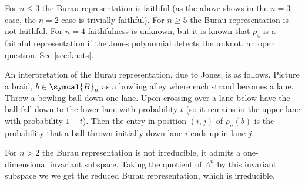 \documentclass[fleqn]{NotesClass}
\newcommand{\braid}{\symcal{B}}
\begin{document}
    \begin{remark}{}{}
        For \(n \le 3\) the Burau representation is faithful (as the above shows in the \(n = 3\) case, the \(n = 2\) case is trivially faithful).
        For \(n \ge 5\) the Burau representation is not faithful.
        For \(n = 4\) faithfulness is unknown, but it is known that \(\rho_4\) is a faithful representation if the Jones polynomial detects the unknot, an open question.
        See \cref{sec:knots}.
        
        An interpretation of the Burau representation, due to Jones, is as follows.
        Picture a braid, \(b \in \braid_n\) as a bowling alley where each strand becomes a lane.
        Throw a bowling ball down one lane.
        Upon crossing over a lane below have the ball fall down to the lower lane with probability \(t\) (so it remains in the upper lane with probability \(1 - t\)).
        Then the entry in position \((i, j)\) of \(\rho_n(b)\) is the probability that a ball thrown initially down lane \(i\) ends up in lane \(j\).
    \end{remark}
    
    For \(n > 2\) the Burau representation is not irreducible, it admits a one-dimensional invariant subspace.
    Taking the quotient of \(\Lambda^n\) by this invariant subspace we we get the reduced Burau representation, which is irreducible.
    
\end{document}
